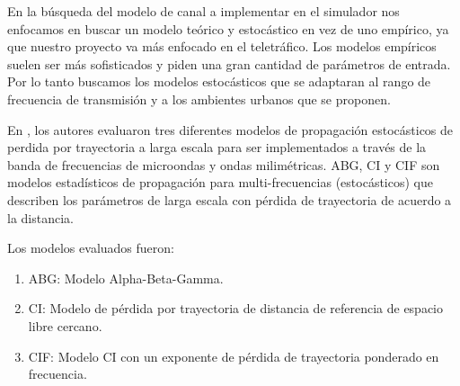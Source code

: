 En la búsqueda del modelo de canal a implementar en el simulador nos enfocamos en buscar un modelo teórico y estocástico en vez de uno empírico, ya que nuestro proyecto va más enfocado en el teletráfico. Los modelos empíricos suelen ser más sofisticados y piden una gran cantidad de parámetros de entrada. Por lo tanto buscamos los modelos estocásticos que se adaptaran al rango de frecuencia de transmisión y a los ambientes urbanos que se proponen.\newline

En \parencite{Sun2016}, los autores evaluaron tres diferentes modelos de propagación estocásticos de perdida por trayectoria a larga escala para ser implementados a través de la banda de frecuencias de microondas y ondas milimétricas. ABG, CI y CIF son modelos estadísticos de propagación para multi-frecuencias (estocásticos) que describen los parámetros de larga escala con pérdida de trayectoria de acuerdo a la distancia.

Los modelos evaluados fueron: 
\begin{enumerate}
\item  ABG: Modelo Alpha-Beta-Gamma.
\item  CI: Modelo de pérdida por trayectoria de distancia de referencia de espacio libre cercano.
\item  CIF: Modelo CI con un exponente de pérdida de trayectoria ponderado en frecuencia.
\end{enumerate}

